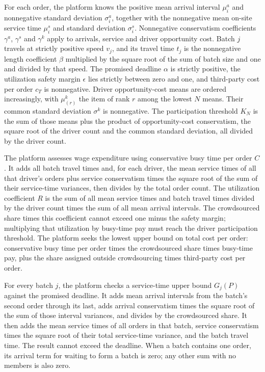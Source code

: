 \documentclass[10pt]{article}
\begin{document}
For each order, the platform knows the positive mean arrival interval $\mu_i^a$ and nonnegative standard deviation $\sigma_i^a$, together with the nonnegative mean on-site service time $\mu_i^s$ and standard deviation $\sigma_i^s$. Nonnegative conservatism coefficients $\gamma^a$, $\gamma^s$ and $\gamma^k$ apply to arrivals, service and driver opportunity cost. Batch $j$ travels at strictly positive speed $v_j$, and its travel time $t_j$ is the nonnegative length coefficient $\beta$ multiplied by the square root of the sum of batch size and one and divided by that speed. The promised deadline $\alpha$ is strictly positive, the utilization safety margin $\epsilon$ lies strictly between zero and one, and third-party cost per order $c_T$ is nonnegative. Driver opportunity-cost means are ordered increasingly, with $\mu_{(r)}^k$ the item of rank $r$ among the lowest $N$ means. Their common standard deviation $\sigma^k$ is nonnegative. The participation threshold $K_N$ is the sum of those means plus the product of opportunity-cost conservatism, the square root of the driver count and the common standard deviation, all divided by the driver count.

The platform assesses wage expenditure using conservative busy time per order $C$. It adds all batch travel times and, for each driver, the mean service times of all that driver's orders plus service conservatism times the square root of the sum of their service-time variances, then divides by the total order count. The utilization coefficient $R$ is the sum of all mean service times and batch travel times divided by the driver count times the sum of all mean arrival intervals. The crowdsourced share times this coefficient cannot exceed one minus the safety margin; multiplying that utilization by busy-time pay must reach the driver participation threshold. The platform seeks the lowest upper bound on total cost per order: conservative busy time per order times the crowdsourced share times busy-time pay, plus the share assigned outside crowdsourcing times third-party cost per order.

For every batch $j$, the platform checks a service-time upper bound $G_j(P)$ against the promised deadline. It adds mean arrival intervals from the batch's second order through its last, adds arrival conservatism times the square root of the sum of those interval variances, and divides by the crowdsourced share. It then adds the mean service times of all orders in that batch, service conservatism times the square root of their total service-time variance, and the batch travel time. The result cannot exceed the deadline. When a batch contains one order, its arrival term for waiting to form a batch is zero; any other sum with no members is also zero.
\end{document}
